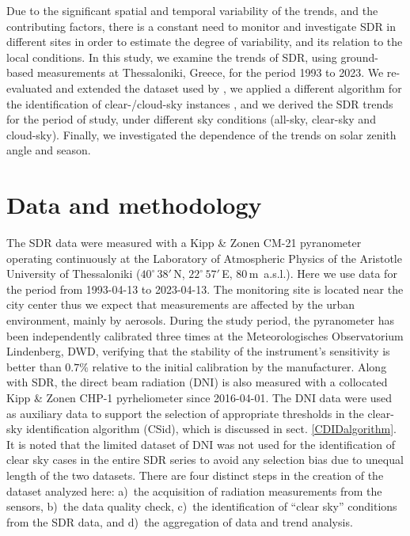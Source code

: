 \documentclass[applsci,article,submit,moreauthors,pdftex]{Definitions/mdpi}
\begin{document}
Due to the significant spatial and temporal variability of the trends,
and the contributing factors, there is a constant need to monitor and
investigate SDR in different sites in order to estimate the degree of
variability, and its relation to the local conditions. In this study, we
examine the trends of SDR, using ground-based measurements at
Thessaloniki, Greece, for the period 1993 to 2023. We re-evaluated and
extended the dataset used by \citet{Bais2013}, we applied a different
algorithm for the identification of clear-/cloud-sky instances
\citep{Reno2016, Reno2012a}, and we derived the SDR trends for the
period of study, under different sky conditions (all-sky, clear-sky and
cloud-sky). Finally, we investigated the dependence of the trends on
solar zenith angle and season.

\hypertarget{data-and-methodology}{%
\section{Data and methodology}\label{data-and-methodology}}

The SDR data were measured with a Kipp \& Zonen CM-21 pyranometer
operating continuously at the Laboratory of Atmospheric Physics of the
Aristotle University of Thessaloniki (\(40^\circ\,38'\,\)N,
\(22^\circ\,57'\,\)E, \(80\,\)m~a.s.l.). Here we use data for the period
from 1993-04-13 to 2023-04-13. The monitoring site is located near the
city center thus we expect that measurements are affected by the urban
environment, mainly by aerosols. During the study period, the
pyranometer has been independently calibrated three times at the
Meteorologisches Observatorium Lindenberg, DWD, verifying that the
stability of the instrument's sensitivity is better than \(0.7\%\)
relative to the initial calibration by the manufacturer. Along with SDR,
the direct beam radiation (DNI) is also measured with a collocated Kipp
\& Zonen CHP-1 pyrheliometer since 2016-04-01. The DNI data were used as
auxiliary data to support the selection of appropriate thresholds in the
clear-sky identification algorithm (CSid), which is discussed in sect.
\ref{CDIDalgorithm}. It is noted that the limited dataset of DNI was not
used for the identification of clear sky cases in the entire SDR series
to avoid any selection bias due to unequal length of the two datasets.
There are four distinct steps in the creation of the dataset analyzed
here: a)~the acquisition of radiation measurements from the sensors,
b)~the data quality check, c)~the identification of ``clear sky''
conditions from the SDR data, and d)~the aggregation of data and trend
analysis.
\end{document}
